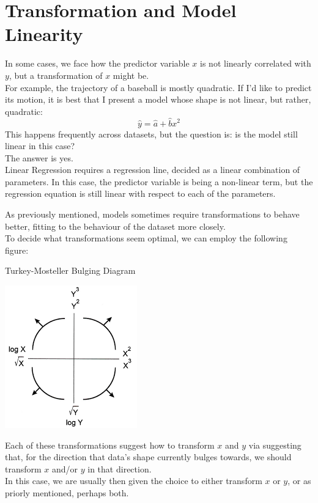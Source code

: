 \section{Transformation and Model Linearity}
In some cases, we face how the predictor variable $x$ is not linearly correlated with $y$, but a transformation of $x$ might be. \\
For example, the trajectory of a baseball is mostly quadratic. If I'd like to predict its motion, it is best that I present a model whose shape is not linear, but rather, quadratic:
\[\hat{y} = \hat{a} + \hat{b} x^2 \]
This happens frequently across datasets, but the question is: is the model still linear in this case? \\
The answer is yes. \\
Linear Regression requires a regression line, decided as a linear combination of parameters. In this case, the predictor variable is being a non-linear term, but the regression equation is still linear with respect to each of the parameters.

As previously mentioned, models sometimes require transformations to behave better, fitting to the behaviour of the dataset more closely. \\
To decide what transformations seem optimal, we can employ the following figure:
\begin{ln-fig}{Turkey-Mosteller Bulging Diagram}{}
    \begin{center}
        \includegraphics[scale=0.6]{figs/ln02/turkey-mosteller.png}
    \end{center}
\end{ln-fig}
Each of these transformations suggest how to transform $x$ and $y$ via suggesting that, for the direction that data's shape currently bulges towards, we should transform $x$ and/or $y$ in that direction. \\
In this case, we are usually then given the choice to either transform $x$ or $y$, or as priorly mentioned, perhaps both.
